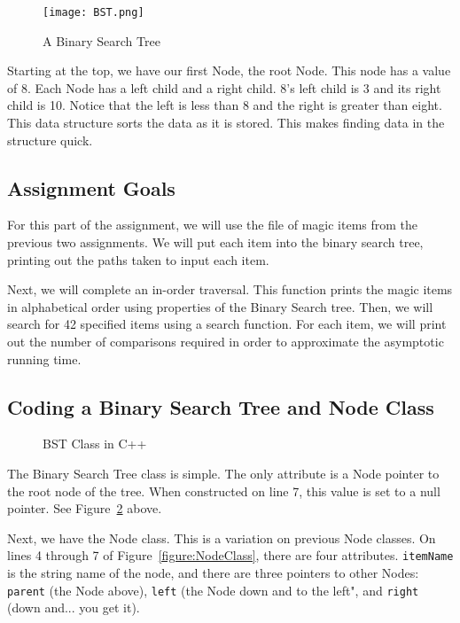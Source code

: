 \documentclass[letterpaper, 10pt,DIV=13]{scrartcl}
\numberwithin{equation}{section} %
\numberwithin{figure}{section} %
\numberwithin{table}{section} %
\begin{document}
\begin{figure}[h] 
    \centering 
    \texttt{[image: BST.png]}
    \caption{A Binary Search Tree\footnotemark}
    \label{figure:BST}

\end{figure}

Starting at the top, we have our first Node, the root Node. This node has a value of 8. Each Node has a left child and a right child. 8's left child is 3 and its right child is 10. Notice that the left is less than 8 and the right is greater than eight. This data structure sorts the data as it is stored. This makes finding data in the structure quick.

\subsection{Assignment Goals}
For this part of the assignment, we will use the file of magic items from the previous two assignments. We will put each item into the binary search tree, printing out the paths taken to input each item. 

Next, we will complete an in-order traversal. This function prints the magic items in alphabetical order using properties of the Binary Search tree. Then, we will search for 42 specified items using a search function. For each item, we will print out the number of comparisons required in order to approximate the asymptotic running time.

\subsection{Coding a Binary Search Tree and Node Class}


\begin{figure}[h] 
    \centering 
    
    \caption{BST Class in C++}
    \label{figure:BSTClass}
\end{figure}

The Binary Search Tree class is simple. The only attribute is a Node pointer to the root node of the tree. When constructed on line 7, this value is set to a null pointer. See Figure~\ref{figure:BSTClass} above.

\pagebreak

Next, we have the Node class. This is a variation on previous Node classes. On lines 4 through 7 of Figure~\ref{figure:NodeClass}, there are four attributes. \texttt{itemName} is the string name of the node, and there are three pointers to other Nodes: \texttt{parent} (the Node above), \texttt{left} (the Node down and to the left", and \texttt{right} (down and... you get it).
\end{document}
